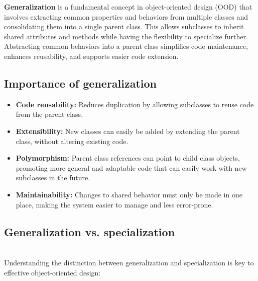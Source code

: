 

\textbf{Generalization} is a fundamental concept in object-oriented design (OOD) that involves extracting common properties and behaviors from multiple classes and consolidating them into a single parent class. This allows subclasses to inherit shared attributes and methods while having the flexibility to specialize further. Abstracting common behaviors into a parent class simplifies code maintenance, enhances reusability, and supports easier code extension.

\subsection{Importance of generalization}\label{vBz0oRqXV9fqOR3yeJXZ6}

\begin{itemize}
\item
\protect{}\label{1jFOB-izxWkOnoVcTp9UQ}
\textbf{Code reusability:} Reduces duplication by allowing subclasses to reuse code from the parent class.
\item
\protect{}\label{yAmoJUtxOgIUwoNV2cq8c}
\textbf{Extensibility:} New classes can easily be added by extending the parent class, without altering existing code.
\item
\protect{}\label{19WS0Z5t45PZMVVC_zP-h}
\textbf{Polymorphism:} Parent class references can point to child class objects, promoting more general and adaptable code that can easily work with new subclasses in the future.
\item
\protect{}\label{PLjvNvmbOhOtcjpsNsXwO}
\textbf{Maintainability:} Changes to shared behavior must only be made in one place, making the system easier to manage and less error-prone.
\end{itemize}

\subsection{Generalization vs. specialization}\label{y066UwXA0-HkM2yhsb61q}
\\
Understanding the distinction between generalization and specialization is key to effective object-oriented design:

